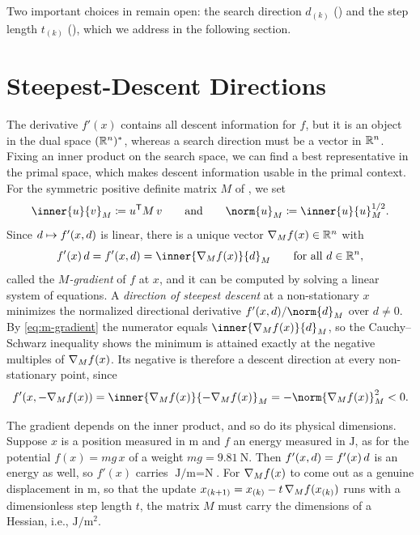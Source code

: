 \documentclass{article}
\newcommand{\iter}[2]{#1_{(#2)}}           %
\begin{document}
Two important choices in  remain open: the search direction $\iter{d}{k}$ () and the step length $\iter{t}{k}$ (), which we address in the following section.

\section{Steepest-Descent Directions}
\label{section:direction}
The derivative $f'(x)$ contains all descent information for $f$, but it is an object in the dual space $(\mathbb{R}^n)^*$, whereas a search direction must be a vector in $\mathbb{R}^n$.
Fixing an inner product on the search space, we can find a best representative in the primal space, which makes descent information usable in the primal context.
For the symmetric positive definite matrix $M$ of , we set
\begin{equation*}
	\inner{u}{v}_M \coloneqq u^\transp M \, v
	\qquad\text{and}\qquad
	\norm{u}_M \coloneqq \inner{u}{u}_M^{1/2}.
\end{equation*}
Since $d \mapsto f'(x, d)$ is linear, there is a unique vector $\nabla_{M} f(x) \in \mathbb{R}^n$ with
\begin{equation}
	\label{eq:m-gradient}
	f'(x)\, d = \dderiv{x}{d} = \inner{\gradM f(x)}{d}_M \qquad \text{for all } d \in \R^n,
\end{equation}
called the \emph{$M$-gradient} of $f$ at $x$, and it can be computed by solving a linear system of equations.
A \emph{direction of steepest descent} at a non-stationary $x$ minimizes the normalized directional derivative $\dderiv{x}{d} / \norm{d}_M$ over $d \neq 0$.
By \eqref{eq:m-gradient} the numerator equals $\inner{\gradM f(x)}{d}_M$, so the Cauchy--Schwarz inequality shows the minimum is attained exactly at the negative multiples of $\nabla_{M} f(x)$.
Its negative is therefore a descent direction at every non-stationary point, since
\begin{equation}
	\label{eq:m-descent}
	\dderiv{x}{-\gradM f(x)} = \inner{\gradM f(x)}{-\gradM f(x)}_M = -\norm{\gradM f(x)}_M^2 < 0.
\end{equation}

\begin{remark}
	The gradient depends on the inner product, and so do its physical dimensions.
	Suppose $x$ is a position measured in $\unit{\meter}$ and $f$ an energy measured in $\unit{\joule}$, as for the potential $f(x) = m g \, x$ of a weight $m g = \qty{9.81}{\newton}$.
	Then $f'(x, d) = f'(x)\, d$ is an energy as well, so $f'(x)$ carries $\unit{\joule\per\meter} = \unit{\newton}$.
	For $\nabla_{M} f(x)$ to come out as a genuine displacement in $\unit{\meter}$, so that the update $\iter{x}{k+1} = \iter{x}{k} - t \, \gradM f(\iter{x}{k})$ runs with a dimensionless step length $t$, the matrix $M$ must carry the dimensions of a Hessian, i.e., $\unit{\joule\per\meter\squared}$.
\end{remark}
\end{document}
